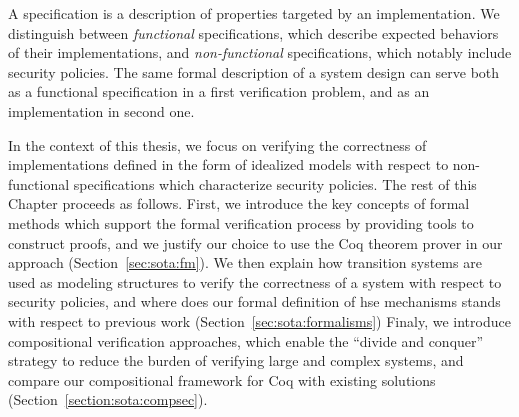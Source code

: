 %
A specification is a description of properties targeted by an implementation.
%
We distinguish between \emph{functional} specifications, which describe expected
behaviors of their implementations,
and \emph{non-functional} specifications, which notably include security
policies.
%
The same formal description of a system design can serve both as a functional
specification in a first verification problem, and as an implementation in
second one.
%

In the context of this thesis, we focus on verifying the correctness of
implementations defined in the form of idealized models with respect to
non-functional specifications which characterize security policies.
%
%
%
The rest of this Chapter proceeds as follows.
%
First, we introduce the key concepts of formal
methods which support the formal verification process by providing tools to
construct proofs, and we justify our choice to use the Coq theorem prover in our
approach (Section~\ref{sec:sota:fm}).
%
We then explain how transition systems are used as modeling structures to verify
the correctness of a system with respect to security policies, and where does
our formal definition of \ac{hse} mechanisms stands with respect to previous
work (Section~\ref{sec:sota:formalisms})
%
Finaly, we introduce compositional verification approaches, which enable the
``divide and conquer'' strategy to reduce the burden of verifying large and
complex systems, and compare our compositional framework for Coq with existing
solutions (Section~\ref{section:sota:compsec}).


